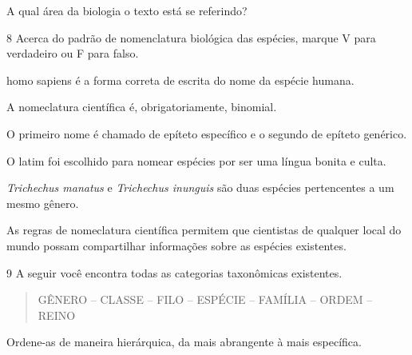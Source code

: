 A qual área da biologia o texto está se referindo?



\num{8}  Acerca do padrão de nomenclatura biológica das espécies, marque V para verdadeiro ou F para falso.

\begin{boxlist}
\item homo sapiens é a forma correta de escrita do nome da espécie humana. 

\item A nomeclatura científica é, obrigatoriamente, binomial. 

\item O primeiro nome é chamado de epíteto específico e o segundo de
epíteto genérico. 

\item O latim foi escolhido para nomear espécies por ser uma língua bonita
e culta. 

\item \emph{Trichechus manatus} e \emph{Trichechus inunguis} são duas
espécies pertencentes a um mesmo gênero. 

\item As regras de nomeclatura científica permitem que cientistas de
qualquer local do mundo possam compartilhar informações sobre as
espécies existentes. 
\end{boxlist}

\num{9}  A seguir você encontra todas as categorias taxonômicas existentes.

\begin{quote}
GÊNERO -- CLASSE -- FILO -- ESPÉCIE -- FAMÍLIA -- ORDEM -- REINO
\end{quote}

Ordene-as de maneira hierárquica, da mais abrangente à mais específica.

